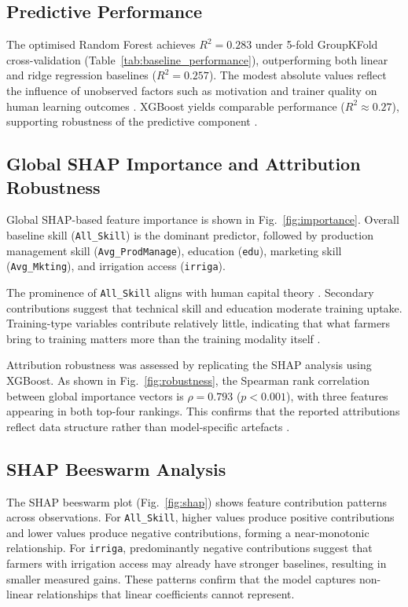 \documentclass[3p,twocolumn,authoryear]{elsarticle}
\begin{document}
\subsection{Predictive Performance}

The optimised Random Forest achieves $R^{2} = 0.283$ under 5-fold
GroupKFold cross-validation (Table~\ref{tab:baseline_performance}),
outperforming both linear and ridge regression baselines
($R^{2} = 0.257$).
The modest absolute values reflect the influence of unobserved factors
such as motivation and trainer quality on human learning outcomes
\citep{davis2012}.
XGBoost yields comparable performance ($R^{2} \approx 0.27$),
supporting robustness of the predictive component \citep{chen2016}.

\subsection{Global SHAP Importance and Attribution Robustness}

Global SHAP-based feature importance is shown in Fig.~\ref{fig:importance}.
Overall baseline skill (\texttt{All\_Skill}) is the dominant predictor,
followed by production management skill (\texttt{Avg\_ProdManage}),
education (\texttt{edu}), marketing skill (\texttt{Avg\_Mkting}), and
irrigation access (\texttt{irriga}).

The prominence of \texttt{All\_Skill} aligns with human capital theory
\citep{feder1985}.
Secondary contributions suggest that technical skill and education
moderate training uptake.
Training-type variables contribute relatively little, indicating that
what farmers bring to training matters more than the training modality
itself \citep{ryo2022}.

Attribution robustness was assessed by replicating the SHAP analysis
using XGBoost.
As shown in Fig.~\ref{fig:robustness}, the Spearman rank correlation
between global importance vectors is $\rho = 0.793$ ($p < 0.001$), with
three features appearing in both top-four rankings.
This confirms that the reported attributions reflect data structure rather
than model-specific artefacts \citep{lundberg2020}.

\subsection{SHAP Beeswarm Analysis}

The SHAP beeswarm plot (Fig.~\ref{fig:shap}) shows feature contribution
patterns across observations.
For \texttt{All\_Skill}, higher values produce positive contributions and
lower values produce negative contributions, forming a near-monotonic
relationship.
For \texttt{irriga}, predominantly negative contributions suggest that
farmers with irrigation access may already have stronger baselines,
resulting in smaller measured gains.
These patterns confirm that the model captures non-linear relationships
that linear coefficients cannot represent.
\end{document}
